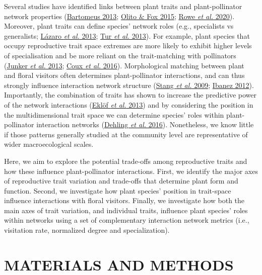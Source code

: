 \documentclass[
  12pt,
  a4paper,
]{article}
\begin{document}
Several studies have identified links between plant traits and plant-pollinator network properties (\protect\hyperlink{ref-bartomeus2013}{Bartomeus 2013}; \protect\hyperlink{ref-olito2015}{Olito \& Fox 2015}; \protect\hyperlink{ref-rowe2020}{Rowe \emph{et al.} 2020}). Moreover, plant traits can define species' network roles (e.g., specialists vs generalists; \protect\hyperlink{ref-lazaro2013}{Lázaro \emph{et al.} 2013}; \protect\hyperlink{ref-tur2013}{Tur \emph{et al.} 2013}). For example, plant species that occupy reproductive trait space extremes are more likely to exhibit higher levels of specialisation and be more reliant on the trait-matching with pollinators (\protect\hyperlink{ref-junker2013}{Junker \emph{et al.} 2013}; \protect\hyperlink{ref-coux2016}{Coux \emph{et al.} 2016}). Morphological matching between plant and floral visitors often determines plant-pollinator interactions, and can thus strongly influence interaction network structure (\protect\hyperlink{ref-stang2009}{Stang \emph{et al.} 2009}; \protect\hyperlink{ref-ibanez2012}{Ibanez 2012}). Importantly, the combination of traits has shown to increase the predictive power of the network interactions (\protect\hyperlink{ref-eklof2013}{Eklöf \emph{et al.} 2013}) and by considering the position in the multidimensional trait space we can determine species' roles within plant-pollinator interaction networks (\protect\hyperlink{ref-dehling2016}{Dehling \emph{et al.} 2016}). Nonetheless, we know little if those patterns generally studied at the community level are representative of wider macroecological scales.

Here, we aim to explore the potential trade-offs among reproductive traits and how these influence plant-pollinator interactions. First, we identify the major axes of reproductive trait variation and trade-offs that determine plant form and function. Second, we investigate how plant species' position in trait-space influence interactions with floral visitors. Finally, we investigate how both the main axes of trait variation, and individual traits, influence plant species' roles within networks using a set of complementary interaction network metrics (i.e., visitation rate, normalized degree and specialization).

\hypertarget{materials-and-methods}{%
\section{MATERIALS AND METHODS}\label{materials-and-methods}}
\end{document}
